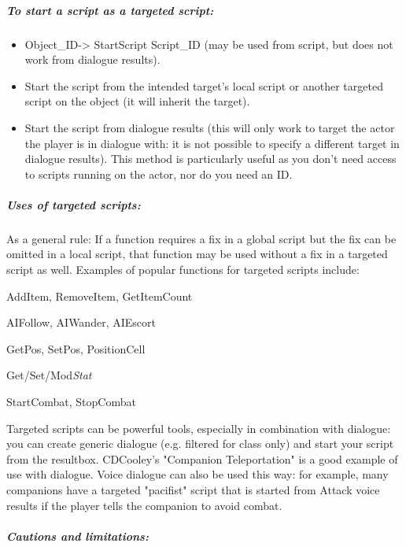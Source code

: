 \hypertarget{to-start-a-script-as-a-targeted-script}{%
\subparagraph{To start a script as a targeted
script:}\label{to-start-a-script-as-a-targeted-script}}

\begin{itemize}
\item
  Object\_ID-> StartScript Script\_ID (may be used from
  script, but does not work from dialogue results).
\item
  Start the script from the intended target's local script or another
  targeted script on the object (it will inherit the target).
\item
  Start the script from dialogue results (this will only work to target
  the actor the player is in dialogue with: it is not possible to
  specify a different target in dialogue results). This method is
  particularly useful as you don't need access to scripts running on the
  actor, nor do you need an ID.
\end{itemize}

\hypertarget{uses-of-targeted-scripts}{%
\subparagraph{Uses of targeted
scripts:}\label{uses-of-targeted-scripts}}

As a general rule: If a function requires a fix in a global script but
the fix can be omitted in a local script, that function may be used
without a fix in a targeted script as well. Examples of popular
functions for targeted scripts include:

AddItem, RemoveItem, GetItemCount

AIFollow, AIWander, AIEscort

GetPos, SetPos, PositionCell

Get/Set/Mod\emph{Stat}

StartCombat, StopCombat

Targeted scripts can be powerful tools, especially in combination with
dialogue: you can create generic dialogue (e.g. filtered for class only)
and start your script from the resultbox. CDCooley's "Companion
Teleportation" is a good example of use with dialogue. Voice dialogue
can also be used this way: for example, many companions have a targeted
"pacifist" script that is started from Attack voice results if the
player tells the companion to avoid combat.

\hypertarget{cautions-and-limitations}{%
\subparagraph{Cautions and
limitations:}\label{cautions-and-limitations}}

